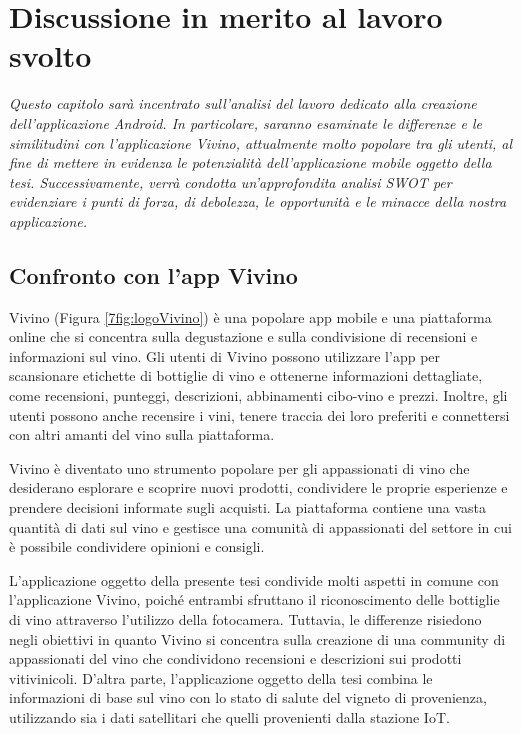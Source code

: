 \chapter{Discussione in merito al lavoro svolto}

\begin{preamble}
{\em
Questo capitolo sarà incentrato sull'analisi del lavoro dedicato alla creazione dell'applicazione Android. In particolare, saranno esaminate le differenze e le similitudini con l'applicazione Vivino, attualmente molto popolare tra gli utenti, al fine di mettere in evidenza le potenzialità dell'applicazione mobile oggetto della tesi. \newline \indent Successivamente, verrà condotta un'approfondita analisi SWOT per evidenziare i punti di forza, di debolezza, le opportunità e le minacce della nostra applicazione.
}
\end{preamble}

\section{Confronto con l'app Vivino}

Vivino (Figura \ref{7fig:logoVivino}) è una popolare app mobile e una piattaforma online che si concentra sulla degustazione e sulla condivisione di recensioni e informazioni sul vino. Gli utenti di Vivino possono utilizzare l'app per scansionare etichette di bottiglie di vino e ottenerne informazioni dettagliate, come recensioni, punteggi, descrizioni, abbinamenti cibo-vino e prezzi. Inoltre, gli utenti possono anche recensire i vini, tenere traccia dei loro preferiti e connettersi con altri amanti del vino sulla piattaforma.

Vivino è diventato uno strumento popolare per gli appassionati di vino che desiderano esplorare e scoprire nuovi prodotti, condividere le proprie esperienze e prendere decisioni informate sugli acquisti. La piattaforma contiene una vasta quantità di dati sul vino e gestisce una comunità di appassionati del settore in cui è possibile condividere opinioni e consigli.

L'applicazione oggetto della presente tesi condivide molti aspetti in comune con l'applicazione Vivino, poiché entrambi sfruttano il riconoscimento delle bottiglie di vino attraverso l'utilizzo della fotocamera. Tuttavia, le differenze risiedono negli obiettivi in quanto Vivino si concentra sulla creazione di una community di appassionati del vino che condividono recensioni e descrizioni sui prodotti vitivinicoli. D'altra parte, l'applicazione oggetto della tesi combina le informazioni di base sul vino con lo stato di salute del vigneto di provenienza, utilizzando sia i dati satellitari che quelli provenienti dalla stazione IoT.

